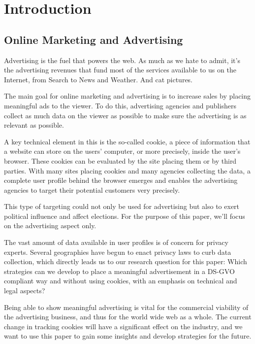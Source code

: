%
%

\pagebreak
\section{Introduction}

\onehalfspacing

\subsection{Online Marketing and Advertising}

Advertising is the fuel that powers the web. As much as we hate to admit, it's the advertising revenues that fund most of the services available to us on the Internet, from Search to News and Weather. And cat pictures.

The main goal for online marketing and advertising is to increase sales by placing meaningful ads to the viewer. To do this, advertising agencies and publishers collect as much data on the viewer as possible to make sure the advertising is as relevant as possible.

A key technical element in this is the so-called cookie, a piece of information that a website can store on the users' computer, or more precisely, inside the user's browser. These cookies can be evaluated by the site placing them or by third parties. With many sites placing cookies and many agencies collecting the data, a complete user profile behind the browser emerges and enables the advertising agencies to target their potential customers very precisely.

This type of targeting could not only be used for advertising but also to exert political influence and affect elections. For the purpose of this paper, we'll focus on the advertising aspect only. 

The vast amount of data available in user profiles is of concern for privacy experts. Several geographies have begun to enact privacy laws to curb data collection, which directly leads us to our research question for this paper: Which strategies can we develop to place a meaningful advertisement in a DS-GVO compliant way and without using cookies, with an emphasis on technical and legal aspects?

Being able to show meaningful advertising is vital for the commercial viability of the advertising business, and thus for the world wide web as a whole. The current change in tracking cookies will have a significant effect on the industry, and we want to use this paper to gain some insights and develop strategies for the future.

